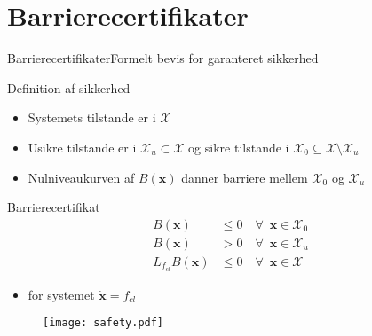 \section{Barrierecertifikater}
\begin{frame}{Barrierecertifikater}{Formelt bevis for garanteret sikkerhed}
\vspace{2mm}
\begin{block}{Definition af sikkerhed}
	\begin{itemize}
		\item Systemets tilstande er i $\mathcal{X}$
		\item Usikre tilstande er i $\mathcal{X}_u\subset\mathcal{X}$ og sikre tilstande i $\mathcal{X}_0\subseteq\mathcal{X}\setminus\mathcal{X}_u$
		\item Nulniveaukurven af $B(\textbf{x})$ danner  barriere mellem $\mathcal{X}_0$ og $\mathcal{X}_u$
	\end{itemize}
\end{block}
\begin{minipage}[b]{0.4\linewidth}
	\vspace{2mm}
	\begin{block}{Barrierecertifikat}
		\vspace{-5mm}
	\begin{align*}
	B(\mathbf{x})&\leq 0 \quad \forall\,\,\,\mathbf{x}\in\mathcal{X}_0\\
	B(\mathbf{x})&> 0 \quad \forall\,\,\,\mathbf{x}\in\mathcal{X}_u\\
	L_{f_{cl}}B(\mathbf{x})&\leq 0 \quad \forall\,\,\,\mathbf{x}\in\mathcal{X}
	\end{align*}
	\vspace{-5mm}
	\begin{itemize}
		\item for systemet $\dot{\mathbf{x}}=f_{cl}$
	\end{itemize}
\end{block}
\end{minipage}
\hspace{2mm}
\begin{minipage}[b]{0.55\linewidth}
\begin{figure}[h]
	\centering
	\texttt{[image: safety.pdf]}
\end{figure}
\end{minipage}
\end{frame}

